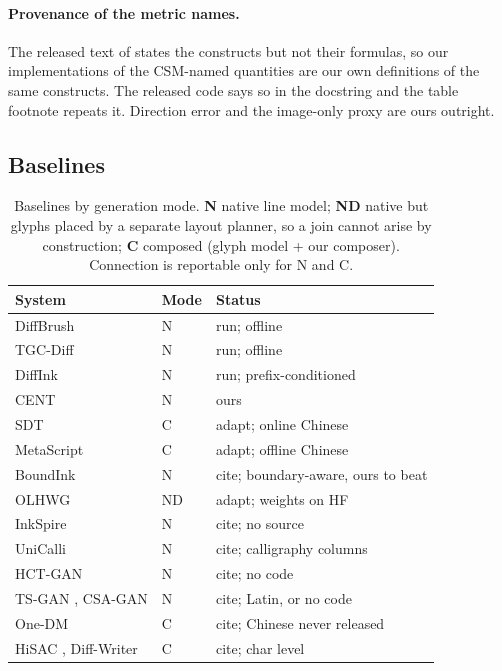 \documentclass[conference]{IEEEtran}
\begin{document}
\paragraph{Provenance of the metric names.} The released text of \cite{boundink} states the
constructs but not their formulas, so our implementations of the CSM-named quantities are our
own definitions of the same constructs. The released code says so in the docstring and the
table footnote repeats it. Direction error and the image-only proxy are ours outright.

\subsection{Baselines}
\begin{table}[t]
\centering
\footnotesize
\caption{Baselines by generation mode. \textbf{N} native line model; \textbf{ND} native but
glyphs placed by a separate layout planner, so a join cannot arise by construction;
\textbf{C} composed (glyph model + our composer). Connection is reportable only for N and C.}
\label{tab:baselines}
\setlength{\tabcolsep}{3pt}
\begin{tabular}{@{}l l p{2.4cm}@{}}
\toprule
System & Mode & Status \\
\midrule
DiffBrush \cite{diffbrush} & N & run; offline \\
TGC-Diff \cite{tgc_diff} & N & run; offline \\
DiffInk \cite{diffink} & N & run; prefix-conditioned \\
CENT & N & ours \\
\midrule
SDT \cite{sdt} & C & adapt; online Chinese \\
MetaScript \cite{metascript} & C & adapt; offline Chinese \\
\midrule
BoundInk \cite{boundink} & N & cite; boundary-aware, ours to beat \\
OLHWG \cite{layout_glyph} & ND & adapt; weights on HF \\
InkSpire \cite{inkspire} & N & cite; no source \\
UniCalli \cite{unicalli} & N & cite; calligraphy columns \\
HCT-GAN \cite{hct_gan} & N & cite; no code \\
TS-GAN \cite{ts_gan}, CSA-GAN \cite{csa_gan} & N & cite; Latin, or no code \\
One-DM \cite{one_dm} & C & cite; Chinese never released \\
HiSAC \cite{hisac}, Diff-Writer \cite{diffwriter} & C & cite; char level \\
\bottomrule
\end{tabular}
\end{table}
\end{document}
